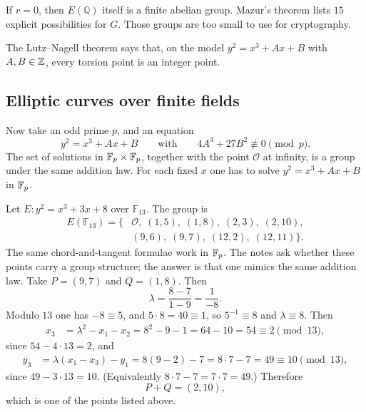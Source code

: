 If $r=0$, then $E(\mathbb{Q})$ itself is a finite abelian group. Mazur's theorem lists $15$ explicit possibilities for $G$. Those groups are too small to use for cryptography.

The Lutz--Nagell theorem says that, on the model $y^2=x^3+Ax+B$ with $A,B\in\mathbb Z$, every torsion point is an integer point.

\subsection{Elliptic curves over finite fields}

Now take an odd prime $p$, and an equation
\[
    y^2=x^3+Ax+B
    \qquad\text{with}\qquad
    4A^3+27B^2\not\equiv 0\pmod{p}.
\]
The set of solutions in $\mathbb F_p\times\mathbb F_p$, together with the point $\mathcal{O}$ at infinity, is a group under the same addition law. For each fixed $x$ one has to solve $y^2=x^3+Ax+B$ in $\mathbb F_p$.

\begin{example}
\label{ex:f13}
Let $E\colon y^2=x^3+3x+8$ over $\mathbb{F}_{13}$. The group is
\begin{align*}
    E(\mathbb{F}_{13})
    =\{&
        \mathcal{O},\;
        (1,5),\;(1,8),\;
        (2,3),\;(2,10),\\
        &(9,6),\;(9,7),\;
        (12,2),\;(12,11)
    \}.
\end{align*}
The same chord-and-tangent formulae work in $\mathbb F_p$. The notes ask whether these points carry a group structure; the answer is that one mimics the same addition law. Take $P=(9,7)$ and $Q=(1,8)$. Then
\[
    \lambda
    =\frac{8-7}{1-9}
    =\frac{1}{-8}.
\]
Modulo $13$ one has $-8\equiv 5$, and $5\cdot 8=40\equiv 1$, so $5^{-1}\equiv 8$ and $\lambda\equiv 8$. Then
\begin{align*}
    x_3
    &=\lambda^2-x_1-x_2
     =8^2-9-1
     =64-10
     =54
     \equiv 2\pmod{13},
\end{align*}
since $54-4\cdot 13=2$, and
\begin{align*}
    y_3
    &=\lambda(x_1-x_3)-y_1
     =8(9-2)-7
     =8\cdot 7-7
     =49
     \equiv 10\pmod{13},
\end{align*}
since $49-3\cdot 13=10$. (Equivalently $8\cdot 7-7=7\cdot 7=49$.) Therefore
\[
    P+Q=(2,10),
\]
which is one of the points listed above.
\end{example}

